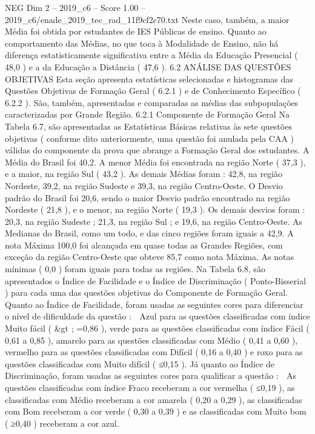 \begin{textsample}{NEG Dim 2 – 2019\_c6 – Score 1.00 – 2019\_c6/enade\_2019\_tec\_rad\_11f9cf2c70.txt}
Neste caso, também, a maior Média foi obtida por estudantes de IES Públicas de ensino.
Quanto ao comportamento das Médias, no que toca à Modalidade de Ensino, não há diferença estatisticamente significativa entre a Média da Educação Presencial ( 48,0 ) e a da Educação a Distância ( 47,6 ). 6.2 ANÁLISE DAS QUESTÕES OBJETIVAS Esta seção apresenta estatísticas selecionadas e histogramas das Questões Objetivas de Formação Geral ( 6.2.1 ) e de Conhecimento Específico ( 6.2.2 ).
São, também, apresentadas e comparadas as médias das subpopulações caracterizadas por Grande Região. 6.2.1 Componente de Formação Geral Na Tabela 6.7, são apresentadas as Estatísticas Básicas relativas às sete questões objetivas ( conforme dito anteriormente, uma questão foi anulada pela CAA ) válidas do componente da prova que abrange a Formação Geral dos estudantes.
A Média do Brasil foi 40,2.
A menor Média foi encontrada na região Norte ( 37,3 ), e a maior, na região Sul ( 43,2 ).
As demais Médias foram : 42,8, na região Nordeste, 39,2, na região Sudeste e 39,3, na região Centro-Oeste.
O Desvio padrão do Brasil foi 20,6, sendo o maior Desvio padrão encontrado na região Nordeste ( 21,8 ), e o menor, na região Norte ( 19,3 ).
Os demais desvios foram : 20,3, na região Sudeste ; 21,3, na região Sul ; e 19,6, na região Centro-Oeste.
As Medianas do Brasil, como um todo, e das cinco regiões foram iguais a 42,9.
A nota Máxima 100,0 foi alcançada em quase todas as Grandes Regiões, com exceção da região Centro-Oeste que obteve 85,7 como nota Máxima.
As notas mínimas ( 0,0 ) foram iguais para todas as regiões.
Na Tabela 6.8, são apresentados o Índice de Facilidade e o Índice de Discriminação ( Ponto-Bisserial ) para cada uma das questões objetivas do Componente de Formação Geral.
Quanto ao Índice de Facilidade, foram usadas as seguintes cores para diferenciar o nível de dificuldade da questão :  Azul para as questões classificadas com índice Muito fácil ( \&gt ; =0,86 ), verde para as questões classificadas com índice Fácil ( 0,61 a 0,85 ), amarelo para as questões classificadas com Médio ( 0,41 a 0,60 ), vermelho para as questões classificadas com Difícil ( 0,16 a 0,40 ) e roxo para as questões classificadas com Muito difícil ( ≤0,15 ).
Já quanto ao Índice de Discriminação, foram usadas as seguintes cores para qualificar a questão :  As questões classificadas com índice Fraco receberam a cor vermelha ( ≤0,19 ), as classificadas com Médio receberam a cor amarela ( 0,20 a 0,29 ), as classificadas com Bom receberam a cor verde ( 0,30 a 0,39 ) e as classificadas com Muito bom ( ≥0,40 ) receberam a cor azul.

\end{textsample}
